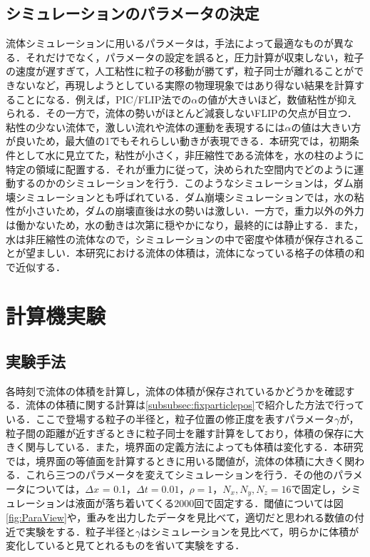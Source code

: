 \documentclass[a4j,12pt]{jreport}
\begin{document}
\section{シミュレーションのパラメータの決定} \label{sec:constant}
流体シミュレーションに用いるパラメータは，手法によって最適なものが異なる．それだけでなく，パラメータの設定を誤ると，圧力計算が収束しない，粒子の速度が遅すぎて，人工粘性に粒子の移動が勝てず，粒子同士が離れることができないなど，再現しようとしている実際の物理現象ではあり得ない結果を計算することになる．例えば，PIC/FLIP法での$\alpha$の値が大きいほど，数値粘性が抑えられる．その一方で，流体の勢いがほとんど減衰しないFLIPの欠点が目立つ．粘性の少ない流体で，激しい流れや流体の運動を表現するには$\alpha$の値は大きい方が良いため，最大値の1でもそれらしい動きが表現できる．本研究では，初期条件として水に見立てた，粘性が小さく，非圧縮性である流体を，水の柱のように特定の領域に配置する．それが重力に従って，決められた空間内でどのように運動するのかのシミュレーションを行う．このようなシミュレーションは，ダム崩壊シミュレーションとも呼ばれている．ダム崩壊シミュレーションでは，水の粘性が小さいため，ダムの崩壊直後は水の勢いは激しい．一方で，重力以外の外力は働かないため，水の動きは次第に穏やかになり，最終的には静止する．また，水は非圧縮性の流体なので，シミュレーションの中で密度や体積が保存されることが望ましい．本研究における流体の体積は，流体になっている格子の体積の和で近似する．

\chapter{計算機実験} \label{chapter:5}
\section{実験手法} \label{sec:exp_method}
各時刻で流体の体積を計算し，流体の体積が保存されているかどうかを確認する．流体の体積に関する計算は\ref{subsubsec:fixparticlepos}で紹介した方法で行っている．ここで登場する粒子の半径と，粒子位置の修正度を表すパラメータ$\gamma$が，粒子間の距離が近すぎるときに粒子同士を離す計算をしており，体積の保存に大きく関与している．また，境界面の定義方法によっても体積は変化する．本研究では，境界面の等値面を計算するときに用いる閾値が，流体の体積に大きく関わる．これら三つのパラメータを変えてシミュレーションを行う．その他のパラメータについては，$\varDelta x$ = 0.1，$\varDelta t = 0.01$，$\rho = 1$，$N_x,N_y,N_z = 16$で固定し，シミュレーションは液面が落ち着いてくる$2000回$で固定する．閾値については図\ref{fig:ParaView}や，重みを出力したデータを見比べて，適切だと思われる数値の付近で実験をする．粒子半径と$\gamma$はシミュレーションを見比べて，明らかに体積が変化していると見てとれるものを省いて実験をする．
\end{document}
